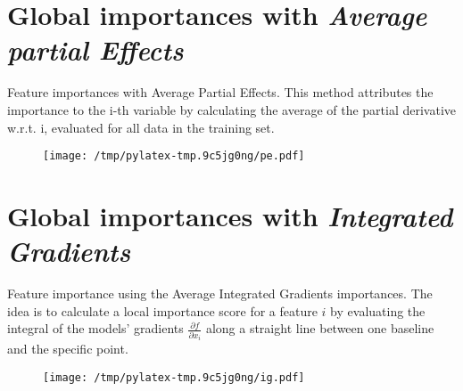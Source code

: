\documentclass{article}%
\begin{document}
\section*{Global importances with \textit{Average partial Effects}}%
\label{sec:GlobalimportanceswithtextitAveragepartialEffects}%

                Feature importances with Average Partial Effects. This method
                attributes the importance to the i-th variable by calculating
                the average of the partial derivative w.r.t. i, evaluated for
                all data in the training set.

                \vfill%


\begin{figure}[H]%
\centering%
\texttt{[image: /tmp/pylatex-tmp.9c5jg0ng/pe.pdf]}%
\end{figure}

%
\vfill \pagebreak

%

                \chead{}
                \rhead{\today, \currenttime}
                
                \lfoot{}
                \cfoot{}
                \rfoot{\thepage\ | \pageref{LastPage}}
\section*{Global importances with \textit{Integrated Gradients}}%
\label{sec:GlobalimportanceswithtextitIntegratedGradients}%

                Feature importance using the Average Integrated Gradients
                importances. The idea is to calculate a local
                importance score for a feature $i$ by evaluating the integral of
                the models' gradients $\frac{\partial f}{\partial x_i}$ along a
                straight line between one baseline and the specific point.
            
                \vfill%


\begin{figure}[H]%
\centering%
\texttt{[image: /tmp/pylatex-tmp.9c5jg0ng/ig.pdf]}%
\end{figure}

%
\vfill \pagebreak

%

                \chead{}
                \rhead{\today, \currenttime}
                
\end{document}

